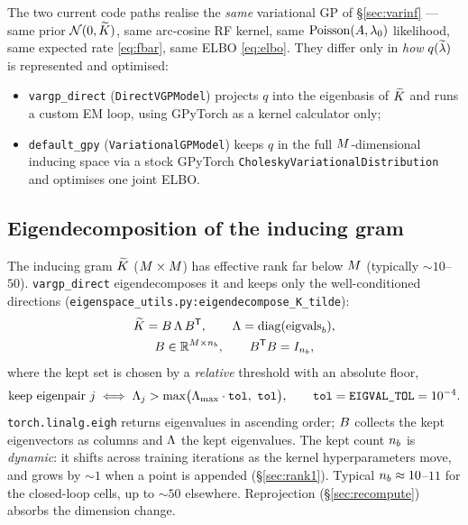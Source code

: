 The two current code paths realise the \emph{same} variational GP of
\S\ref{sec:varinf} --- same prior $\mathcal{N}(0,\widetilde{K})$, same arc-cosine RF kernel,
same $\mathrm{Poisson}(A,\lambda_{0})$ likelihood, same expected rate \eqref{eq:fbar}, same
ELBO \eqref{eq:elbo}. They differ only in \emph{how} $q(\widetilde{\lambda})$ is represented
and optimised:
\begin{itemize}[nosep]
  \item \texttt{vargp\_direct} (\texttt{DirectVGPModel}) projects $q$ into the
    eigenbasis of $\widetilde{K}$ and runs a custom EM loop, using GPyTorch as a kernel
    calculator only;
  \item \texttt{default\_gpy} (\texttt{VariationalGPModel}) keeps $q$ in the full
    $M$-dimensional inducing space via a stock GPyTorch
    \texttt{CholeskyVariationalDistribution} and optimises one joint ELBO.
\end{itemize}

\subsection{Eigendecomposition of the inducing gram}\label{sec:eigdecomp}

The inducing gram $\widetilde{K}$ ($M\times M$) has effective rank far below
$M$ (typically $\sim10$--$50$). \texttt{vargp\_direct} eigendecomposes it and
keeps only the well-conditioned directions
(\texttt{eigenspace\_utils.py:\allowbreak eigendecompose\_K\_tilde}):
\begin{equation}
\begin{gathered}
  \widetilde{K}=B\,\Lambda\,B^{\mathsf{T}},\qquad
  \Lambda=\operatorname{diag}(\text{eigvals}_b), \\
  B\in\mathbb{R}^{M\times n_{b}},\qquad B^{\mathsf{T}}B=I_{n_{b}},
\end{gathered}
  \label{eq:eigdecomp}
\end{equation}
where the kept set is chosen by a \emph{relative} threshold with an absolute
floor,
\begin{equation}
  \text{keep eigenpair }j \iff \Lambda_j > \max\!\big(\Lambda_{\max}\cdot\texttt{tol},\ \texttt{tol}\big),
  \qquad \texttt{tol}=\texttt{EIGVAL\_TOL}=10^{-4}.
  \label{eq:eigthresh}
\end{equation}
\texttt{torch.linalg.eigh} returns eigenvalues in ascending order; $B$ collects
the kept eigenvectors as columns and $\Lambda$ the kept eigenvalues. The kept
count $n_{b}$ is \emph{dynamic}: it shifts across training iterations as the kernel
hyperparameters move, and grows by $\sim1$ when a point is appended
(\S\ref{sec:rank1}). Typical $n_{b}\approx10$--$11$ for the closed-loop cells, up
to $\sim50$ elsewhere. Reprojection (\S\ref{sec:recompute}) absorbs the dimension
change.

